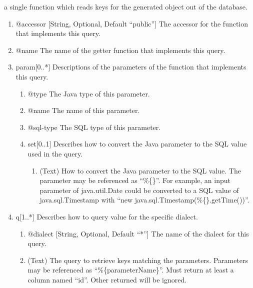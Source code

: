 \documentclass{book}
\begin{document}
\begin{enumerate}
          a single function which reads keys for the generated object out of
          the database.
    \begin{enumerate}
        \item @accessor [String, Optional, Default ``public''] The accessor for
              the function that implements this query.
        \item @name The name of the getter function that implements this query.
        \item param[0..*] Descriptions of the parameters of the function that
              implements this query.
        \begin{enumerate}
            \item @type The Java type of this parameter.
            \item @name The name of this parameter.
            \item @sql-type The SQL type of this parameter.
            \item set[0..1] Describes how to convert the Java parameter to the
                  SQL value used in the query.
            \begin{enumerate}
                \item (Text) How to convert the Java parameter to the SQL value.
                      The parameter may be referenced as ``\%\{\}''. For
                      example, an input parameter of java.util.Date could be
                      converted to a SQL value of java.sql.Timestamp with
                      ``new java.sql.Timestamp(\%\{\}.getTime())''.
            \end{enumerate}
        \end{enumerate}
        \item q[1..*] Describes how to query value for the specific dialect.
        \begin{enumerate}
            \item @dialect [String, Optional, Default ``*''] The name of the
                  dialect for this query.
            \item (Text) The query to retrieve keys matching the parameters.
                  Parameters may be referenced as ``\%\{parameterName\}''. Must
                  return at least a column named ``id''. Other returned will be
                  ignored.
        \end{enumerate}
    \end{enumerate}
\end{enumerate}
\end{document}
